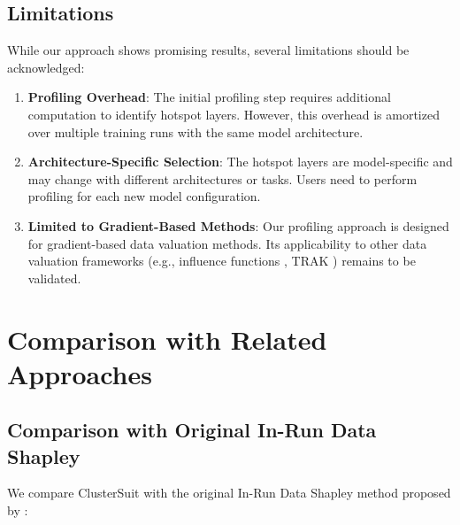 \documentclass[12pt,a4paper]{report}
\begin{document}
\subsection{Limitations}
\label{sec:limitations}

While our approach shows promising results, several limitations should be acknowledged:

\begin{enumerate}
    \item \textbf{Profiling Overhead}: The initial profiling step requires additional computation to identify hotspot layers. However, this overhead is amortized over multiple training runs with the same model architecture.
    
    \item \textbf{Architecture-Specific Selection}: The hotspot layers are model-specific and may change with different architectures or tasks. Users need to perform profiling for each new model configuration.
    
    \item \textbf{Limited to Gradient-Based Methods}: Our profiling approach is designed for gradient-based data valuation methods. Its applicability to other data valuation frameworks (e.g., influence functions \citep{koh2017understanding}, TRAK \citep{park2023trak}) remains to be validated.
\end{enumerate}

\section{Comparison with Related Approaches}
\label{sec:related}

\subsection{Comparison with Original In-Run Data Shapley}
\label{sec:vs_inrun}

We compare ClusterSuit with the original In-Run Data Shapley method proposed by \citet{wang2025data}:
\end{document}

